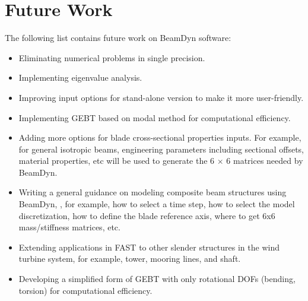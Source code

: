 \chapter{Future Work}
\label{sec:FutureWork}
The following list contains future work on BeamDyn software:

\begin{itemize}
   \item Eliminating numerical problems in single precision.
    \item Implementing eigenvalue analysis.
    \item Improving input options for stand-alone version to make it more user-friendly.
    \item Implementing GEBT based on modal method  for computational efficiency.
    \item Adding more options for blade cross-sectional properties inputs. For example, for general isotropic beams, engineering parameters including sectional offsets, material properties, etc will be used to generate the 6 $\times$ 6 matrices needed by BeamDyn.
    \item Writing a general guidance on modeling composite beam structures using BeamDyn, , for example, how to select a time step, how to select the model discretization, how to define the blade reference axis, where to get 6x6 mass/stiffness matrices, etc.
    \item Extending applications in FAST to other slender structures in the wind turbine system, for example, tower, mooring lines, and shaft.
    \item Developing a simplified form of GEBT with only rotational DOFs (bending, torsion) for computational efficiency.
\end{itemize}